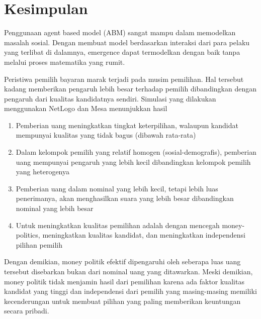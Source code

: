 \section{Kesimpulan}

Penggunaan agent based model (ABM) sangat mampu dalam memodelkan masalah sosial. Dengan membuat model berdasarkan interaksi dari para pelaku yang terlibat di dalamnya,  emergence  dapat termodelkan dengan baik tanpa melalui proses matematika yang rumit.

Peristiwa pemilih bayaran marak terjadi pada musim pemilihan. Hal tersebut kadang memberikan pengaruh lebih besar terhadap pemilih dibandingkan dengan pengaruh dari kualitas kandidatnya sendiri.  Simulasi yang dilakukan menggunakan NetLogo dan Mesa menunjukkan hasil

\begin{enumerate}
\item Pemberian uang meningkatkan tingkat keterpilihan, walaupun kandidat mempunyai kualitas yang tidak bagus (dibawah rata-rata)

\item Dalam kelompok pemilih yang relatif homogen (sosial-demografis), pemberian uang mempunyai pengaruh yang lebih kecil dibandingkan kelompok pemilih yang heterogenya

\item Pemberian uang dalam nominal yang lebih kecil, tetapi lebih luas penerimanya, akan menghasilkan suara yang lebih besar dibandingkan nominal yang lebih besar

\item Untuk meningkatkan kualitas pemilihan adalah dengan mencegah money-politics, meningkatkan kualitas kandidat, dan meningkatkan independensi pilihan pemilih
\end{enumerate}

Dengan demikian, money politik efektif dipengaruhi oleh seberapa luas uang tersebut disebarkan  bukan dari nominal uang yang ditawarkan. Meski demikian, money politik tidak menjamin hasil dari pemilihan karena ada faktor kualitas kandidat yang tinggi dan independensi dari pemilih yang masing-masing memiliki kecenderungan untuk membuat pilihan yang paling memberikan keuntungan secara pribadi.
